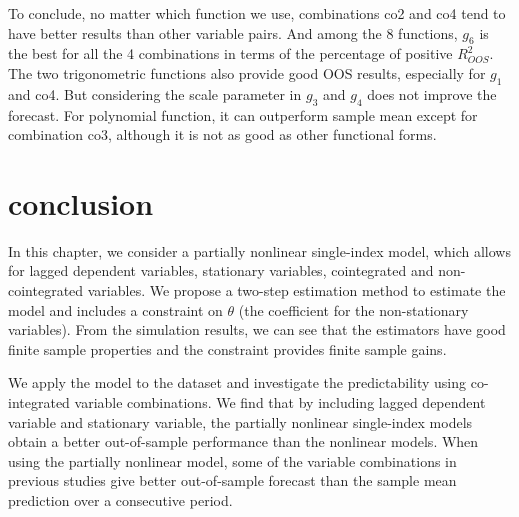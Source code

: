 \documentclass[a4paper,12pt,times,numbered,print,index]{report}
\numberwithin{equation}{section}
\begin{document}
To conclude, no matter which function we use, combinations co2 and co4 tend to have better results than other variable pairs. And among the 8 functions, $g_6$ is the best for all the 4 combinations in terms of the percentage of positive $R^2_{OOS}$. The two trigonometric functions also provide good OOS results, especially for $g_1$ and co4. But considering the scale parameter in $g_3$ and $g_4$ does not improve the forecast. For polynomial function, it can outperform sample mean except for combination co3, although it is not as good as other functional forms.

\section{conclusion}
In this chapter, we consider a partially nonlinear single-index model, which allows for lagged dependent variables, stationary variables, cointegrated and non-cointegrated variables. We propose a two-step estimation method to estimate the model and includes a constraint on $\theta$ (the coefficient for the non-stationary variables). From the simulation results, we can see that the estimators have good finite sample properties and the constraint provides finite sample gains. 

We apply the model to the \cite{welch2008comprehensive} dataset and investigate the predictability using co-integrated variable combinations. We find that by including lagged dependent variable and stationary variable, the partially nonlinear single-index models obtain a better out-of-sample performance than the nonlinear models. When using the partially nonlinear model, some of the variable combinations in previous studies give better out-of-sample forecast than the sample mean prediction over a consecutive period. 
\end{document}
